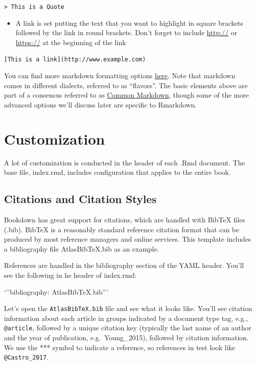 \documentclass[]{tufte-book}
\providecommand{\tightlist}{%
  \setlength{\itemsep}{0pt}\setlength{\parskip}{0pt}}
\begin{document}
\texttt{\textgreater{}\ This\ is\ a\ Quote}

\begin{itemize}
\tightlist
\item
  A link is set putting the text that you want to highlight in square
  brackets followed by the link in round brackets. Don't forget to
  include \url{http://} or \url{https://} at the beginning of the link
\end{itemize}

\texttt{{[}This\ is\ a\ link{]}(http://www.example.com)}

You can find more markdown formatting options
\href{https://bookdown.org/yihui/rmarkdown/markdown-syntax.html}{here}.
Note that markdown comes in different dialects, referred to as
``flavors''. The basic elements above are part of a consensus referred
to as \href{http://commonmark.org/}{Common Markdown}, though some of the
more advanced options we'll discuss later are specific to Rmarkdown.

\chapter{Customization}\label{customization}

A lot of customization is conducted in the header of each .Rmd document.
The base file, index.rmd, includes configuration that applies to the
entire book.

\section{Citations and Citation
Styles}\label{citations-and-citation-styles}

Bookdown has great support for citations, which are handled with BibTeX
files (.bib). BibTeX is a reasonably standard reference citation format
that can be produced by most reference managers and online services.
This template includes a bibliography file AtlasBibTeX.bib as an
example.

References are handled in the bibliography section of the YAML header.
You'll see the following in he header of index.rmd:

`''bibliography: AtlasBibTeX.bib'''

Let's open the \texttt{AtlasBibTeX.bib} file and see what it looks like.
You'll see citation information about each article in groups indicated
by a document type tag, e.g., \texttt{@article}, followed by a unique
citation key (typically the last name of an author and the year of
publication, e.g.~Young\_2015), followed by citation information. We use
the **\citet{*}* symbol to indicate a reference, so references in test
look like \texttt{@Castro\_2017}.
\end{document}
